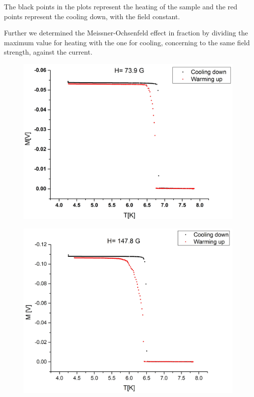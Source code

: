 \documentclass[openany,11pt,a4paper]{report}
\begin{document}
 
The black points in the plots represent the heating of the sample and the red points represent the cooling down, with the field constant. \

Further we determined the Meissner-Ochsenfeld effect in fraction by dividing the maximum value for heating with the one for cooling, concerning to the same field strength, against the current.




\begin{figure}[H]
\begin{center}
\includegraphics[scale=0.35]{finalone.jpg}
\end{center}
\end{figure}




\begin{figure}[H]
\begin{center}
\includegraphics[scale=0.35]{finaltwo.jpg}
\end{center}
\end{figure}
\end{document}
